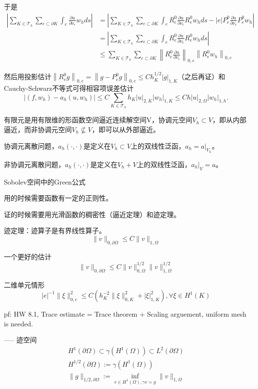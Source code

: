 于是
\[
  \begin{aligned}
    \left| \sum_{K \in \mathcal{T}_{h}} \sum_{e \subset \partial K} \int_{e} \frac{\partial u}{\partial \nu_{e}} w_{h} ds \right| &= \left| \sum_{K \in \mathcal{T}_{h}} \sum_{e \subset \partial K} \int_{e} R_e^0 \frac{\partial u}{\partial \nu_{e}} R_e^0 w_{h} ds - |e| P_e^0 \frac{\partial u}{\partial \nu_{e}} P_e^0 w_{h} \right|\\
    &= \left| \sum_{K \in \mathcal{T}_{h}} \sum_{e \subset \partial K} \int_{e} R_e^0 \frac{\partial u}{\partial \nu_{e}} R_e^0 w_{h} ds \right|\\
    &\le \sum_{K \in \mathcal{T}_{h}} \sum_{e \subset \partial K} \left\| R_e^0 \frac{\partial u}{\partial \nu_{e}} \right\|_{0, e} \left\|R_e^0 w_{h}\right\|_{0, e}
  \end{aligned}
\]

然后用投影估计$\left\|R_{e}^{0} g\right\|_{0, e} = \left\|g-P_{e}^{0} g\right\|_{0, e} \le C h_{K}^{1 / 2}|g|_{1, K}$（之后再证）和Cauchy-Schwarz不等式可得相容项误差估计
\[
  \left|\left(f, w_{h}\right)-a_{h}\left(u, w_{h}\right)\right| \le C \sum_{K \in \mathcal{T}_{h}} h_{K}|u|_{2, K}\left|w_{h}\right|_{1, K} \le C h|u|_{2, \Omega}\left|w_{h}\right|_{1, h}.
\]

有限元是用有限维的形函数空间逼近连续解空间V，协调元空间$V_h \subset V$，即从内部逼近，而非协调元空间$V_h \nsubseteq V$，即可以从外部逼近。

协调元离散问题，$a_{h}(\cdot, \cdot)$是定义在$V_h \subset V$上的双线性泛函，$a_h = a|_{V_h}$。

非协调元离散问题，$a_{h}(\cdot, \cdot)$是定义在$V_{h}+V$上的双线性泛函，$a_h|_{V} = a$。

Sobolev空间中的Green公式

用的时候需要函数有一定的正则性。

证的时候需要用光滑函数的稠密性（逼近定理）和迹定理。

迹定理：迹算子是有界线性算子。
\[
  \|v\|_{0, \partial \Omega} \le C\|v\|_{1, \Omega}
\]

一个更好的估计
\[
  \|v\|_{0, \partial \Omega} \le C\|v\|_{0, \Omega}^{1 / 2}\|v\|_{1, \Omega}^{1 / 2}
\]

二维单元情形
\[
  |e|^{-1}\|\xi\|_{0, e}^{2} \le C\left(h_{K}^{-2}\|\xi\|_{0, K}^{2}+|\xi|_{1, K}^{2}\right), \forall \xi \in H^{1}(K)
\]

pf: HW 8.1, Trace estimate = Trace theorem + Scaling arguement, uniform mesh is needed.

----- 迹空间
\[
  \begin{array}{l}
    H^{1}(\partial \Omega) \subset \gamma\left(H^{1}(\Omega)\right) \subset L^{2}(\partial \Omega)\\
    H^{1 / 2}(\partial \Omega):=\gamma\left(H^{1}(\Omega)\right)\\
    \|g\|_{1 / 2, \partial \Omega}:=\inf_{v \in H^{1}(\Omega), \gamma v=g}\|v\|_{1, \Omega}
  \end{array}
\]

